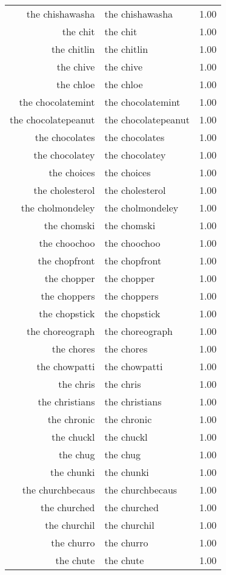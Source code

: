 \begin{table}[ht]
\begin{tabular}{rlr}
  the chishawasha & the chishawasha & 1.00 \\ 
  the chit & the chit & 1.00 \\ 
  the chitlin & the chitlin & 1.00 \\ 
  the chive & the chive & 1.00 \\ 
  the chloe & the chloe & 1.00 \\ 
  the chocolatemint & the chocolatemint & 1.00 \\ 
  the chocolatepeanut & the chocolatepeanut & 1.00 \\ 
  the chocolates & the chocolates & 1.00 \\ 
  the chocolatey & the chocolatey & 1.00 \\ 
  the choices & the choices & 1.00 \\ 
  the cholesterol & the cholesterol & 1.00 \\ 
  the cholmondeley & the cholmondeley & 1.00 \\ 
  the chomski & the chomski & 1.00 \\ 
  the choochoo & the choochoo & 1.00 \\ 
  the chopfront & the chopfront & 1.00 \\ 
  the chopper & the chopper & 1.00 \\ 
  the choppers & the choppers & 1.00 \\ 
  the chopstick & the chopstick & 1.00 \\ 
  the choreograph & the choreograph & 1.00 \\ 
  the chores & the chores & 1.00 \\ 
  the chowpatti & the chowpatti & 1.00 \\ 
  the chris & the chris & 1.00 \\ 
  the christians & the christians & 1.00 \\ 
  the chronic & the chronic & 1.00 \\ 
  the chuckl & the chuckl & 1.00 \\ 
  the chug & the chug & 1.00 \\ 
  the chunki & the chunki & 1.00 \\ 
  the churchbecaus & the churchbecaus & 1.00 \\ 
  the churched & the churched & 1.00 \\ 
  the churchil & the churchil & 1.00 \\ 
  the churro & the churro & 1.00 \\ 
  the chute & the chute & 1.00 \\ 

\end{tabular}
\end{table}
